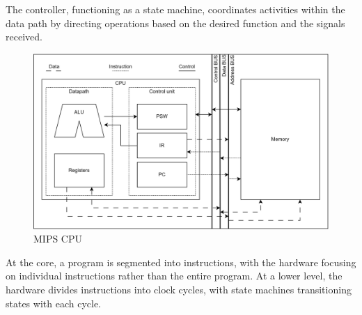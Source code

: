 The controller, functioning as a state machine, coordinates activities within the data path by directing operations based on the desired function and the signals received.
\begin{figure}[H]
    \centering
    \includegraphics[width=0.75\linewidth]{images/cpu.png}
    \caption{MIPS CPU}
\end{figure}
At the core, a program is segmented into instructions, with the hardware focusing on individual instructions rather than the entire program. 
At a lower level, the hardware divides instructions into clock cycles, with state machines transitioning states with each cycle.

